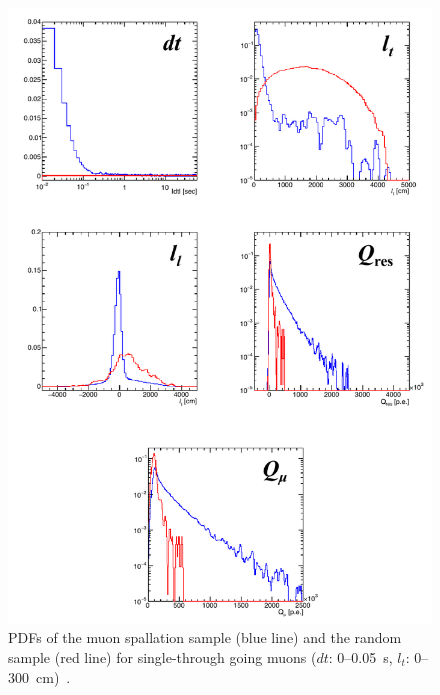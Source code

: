 \begin{figure}[tbp]
	\centering
	\includegraphics[width=14cm]{Figures/Selection/PDF}
	\caption[PDFs of the muon spallation sample and the random sample for single-through going muons ($dt$: 0--0.05~s, $l_{t}$: 0--300~cm)]{
	PDFs of the muon spallation sample (blue line) and the random sample (red line) for single-through going muons ($dt$: 0--0.05~s, $l_{t}$: 0--300~cm)~\cite{2023HaradaPhD}.
	}\label{PDF}
\end{figure}

